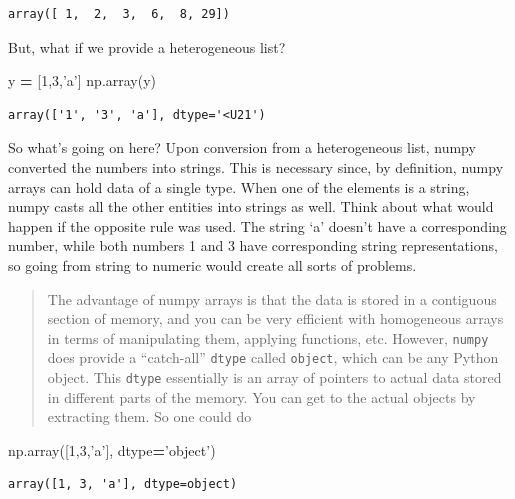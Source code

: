 \documentclass[
  letterpaper,
]{scrbook}
\newenvironment{Shaded}{\begin{snugshade}}{\end{snugshade}}
\newcommand{\DecValTok}[1]{\textcolor[rgb]{0.00,0.00,0.81}{#1}}
\newcommand{\NormalTok}[1]{#1}
\newcommand{\OperatorTok}[1]{\textcolor[rgb]{0.81,0.36,0.00}{\textbf{#1}}}
\newcommand{\StringTok}[1]{\textcolor[rgb]{0.31,0.60,0.02}{#1}}
\begin{document}
\begin{verbatim}
array([ 1,  2,  3,  6,  8, 29])
\end{verbatim}

But, what if we provide a heterogeneous list?

\begin{Shaded}
\begin{Highlighting}[]
\NormalTok{y }\OperatorTok{=}\NormalTok{ [}\DecValTok{1}\NormalTok{,}\DecValTok{3}\NormalTok{,}\StringTok{'a'}\NormalTok{]}
\NormalTok{np.array(y)}
\end{Highlighting}
\end{Shaded}

\begin{verbatim}
array(['1', '3', 'a'], dtype='<U21')
\end{verbatim}

So what's going on here? Upon conversion from a heterogeneous list, numpy converted the numbers into strings. This is necessary since, by definition, numpy arrays can hold data of a single type. When one of the elements is a string, numpy casts all the other entities into strings as well. Think about what would happen if the opposite rule was used. The string `a' doesn't have a corresponding number, while both numbers 1 and 3 have corresponding string representations, so going from string to numeric would create all sorts of problems.

\begin{quote}
The advantage of numpy arrays is that the data is stored in a contiguous section of memory, and you can be very efficient with homogeneous arrays in terms of manipulating them, applying functions, etc. However, \texttt{numpy} does provide a ``catch-all'' \texttt{dtype} called \texttt{object}, which can be any Python object. This \texttt{dtype} essentially is an array of pointers to actual data stored in different parts of the memory. You can get to the actual objects by extracting them. So one could do
\end{quote}

\begin{Shaded}
\begin{Highlighting}[]
\NormalTok{np.array([}\DecValTok{1}\NormalTok{,}\DecValTok{3}\NormalTok{,}\StringTok{'a'}\NormalTok{], dtype}\OperatorTok{=}\StringTok{'object'}\NormalTok{)}
\end{Highlighting}
\end{Shaded}

\begin{verbatim}
array([1, 3, 'a'], dtype=object)
\end{verbatim}
\end{document}
